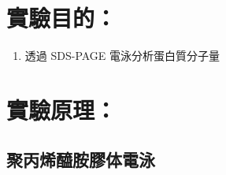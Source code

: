 \setlength{\parindent}{2em} %

\section*{實驗目的：}

\begin{enumerate}[label=\arabic*.]
  \item 透過 SDS-PAGE 電泳分析蛋白質分子量
\end{enumerate}

\section*{實驗原理：}

\subsection{聚丙烯醯胺膠体電泳}
